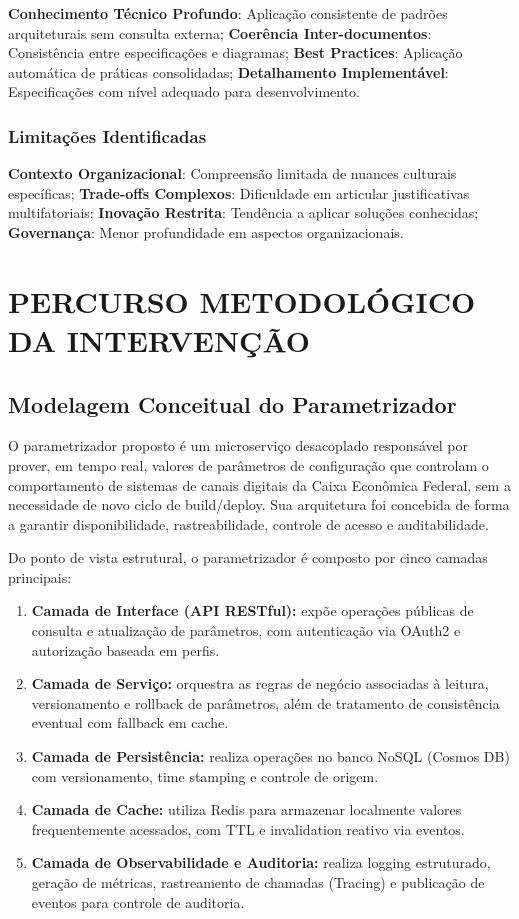 \textbf{Conhecimento Técnico Profundo}: Aplicação consistente de padrões arquiteturais sem consulta externa; \textbf{Coerência Inter-documentos}: Consistência entre especificações e diagramas; \textbf{Best Practices}: Aplicação automática de práticas consolidadas; \textbf{Detalhamento Implementável}: Especificações com nível adequado para desenvolvimento.

\subsection{Limitações Identificadas}

\textbf{Contexto Organizacional}: Compreensão limitada de nuances culturais específicas; \textbf{Trade-offs Complexos}: Dificuldade em articular justificativas multifatoriais; \textbf{Inovação Restrita}: Tendência a aplicar soluções conhecidas; \textbf{Governança}: Menor profundidade em aspectos organizacionais.

\chapter{PERCURSO METODOLÓGICO DA INTERVENÇÃO}

\section{Modelagem Conceitual do Parametrizador}

O parametrizador proposto é um microserviço desacoplado responsável por prover, em tempo real, valores de parâmetros de configuração que controlam o comportamento de sistemas de canais digitais da Caixa Econômica Federal, sem a necessidade de novo ciclo de build/deploy. Sua arquitetura foi concebida de forma a garantir disponibilidade, rastreabilidade, controle de acesso e auditabilidade.

Do ponto de vista estrutural, o parametrizador é composto por cinco camadas principais:

\begin{enumerate}
	\item \textbf{Camada de Interface (API RESTful):} expõe operações públicas de consulta e atualização de parâmetros, com autenticação via OAuth2 e autorização baseada em perfis.
	\item \textbf{Camada de Serviço:} orquestra as regras de negócio associadas à leitura, versionamento e rollback de parâmetros, além de tratamento de consistência eventual com fallback em cache.
	\item \textbf{Camada de Persistência:} realiza operações no banco NoSQL (Cosmos DB) com versionamento, time stamping e controle de origem.
	\item \textbf{Camada de Cache:} utiliza Redis para armazenar localmente valores frequentemente acessados, com TTL e invalidation reativo via eventos.
	\item \textbf{Camada de Observabilidade e Auditoria:} realiza logging estruturado, geração de métricas, rastreamento de chamadas (Tracing) e publicação de eventos para controle de auditoria.
	
	
\end{enumerate}

